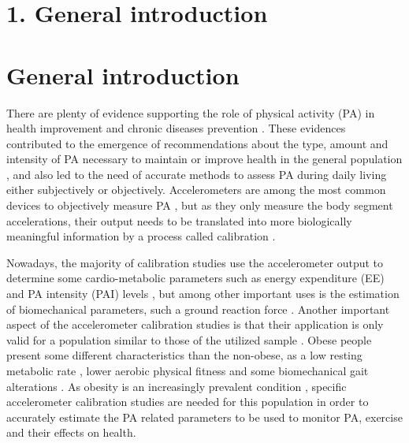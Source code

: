 \documentclass[12pt]{article}
\def\blankpage{%
      \clearpage%
      \thispagestyle{empty}%
      \addtocounter{page}{+0}%
      \null%
      \clearpage}
\begin{document}

\section*{\vfill\raggedleft\bfseries 1. General introduction}
\thispagestyle{empty} 
\blankpage


\section*{General introduction}

There are plenty of evidence supporting the role of physical activity (PA) in health improvement and chronic diseases prevention . These evidences contributed to the emergence of recommendations about the type, amount and intensity of PA necessary to maintain  or improve health in the general population , and also led to the need of accurate methods to assess PA during daily living  either subjectively or objectively. Accelerometers are among the most common devices to objectively measure PA , but as they only measure the body segment accelerations, their output needs to be translated into more biologically meaningful information by a process called calibration .
 
Nowadays, the majority of calibration studies use the accelerometer output to determine some cardio-metabolic parameters such as energy expenditure (EE) and PA intensity (PAI) levels , but among other important uses is the estimation of biomechanical parameters, such a ground reaction force . Another important aspect of the accelerometer calibration studies is that their application is only valid for a population similar to those of the utilized sample . Obese people present some different characteristics than the non-obese, as a low resting metabolic rate , lower aerobic physical fitness  and some biomechanical gait alterations . As obesity is an increasingly prevalent condition , specific accelerometer calibration studies are needed for this population in order to accurately estimate the PA related parameters to be used to monitor PA, exercise and their effects on health.
\end{document}
